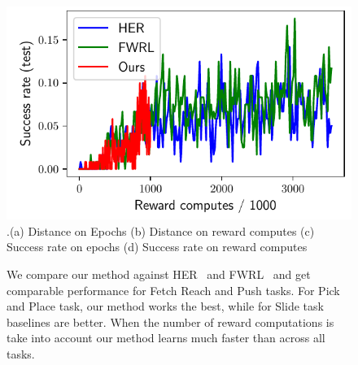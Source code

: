 \begin{figure}
  \includegraphics[width=\frac\columnwidth]{media/res/6efc1de-path_reward_low_thresh_chosen-FetchSlidePR-v1-dqst/reward_computes-test/success_rate.pdf}\\
  {.\tiny\color{blue}\hspace{0.8cm}(a) Distance on Epochs \hspace{1.05cm}(b) Distance on
    reward computes
    \hspace{0.70cm} (c) Success rate on epochs \hspace{0.9cm} (d) Success rate on reward computes}
  \caption{We compare our method against HER~\citep{andrychowicz2016learning}
    and FWRL~\citep{dhiman2018floydwarshall} and get comparable performance for
    Fetch Reach and Push tasks. For Pick and Place task, our method works the
    best, while for Slide task baselines are better.
    When the number of reward computations is take into account our method learns
    much faster than across all tasks.}%
  \label{fig:fetch-results}%
\end{figure}
